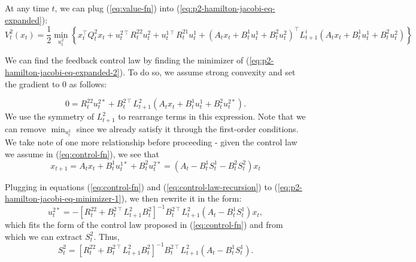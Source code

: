 \documentclass[11pt]{article}
\newcommand{\T}{\intercal}
\newcommand\dd[2]{\frac{\partial#1}{\partial#2}}
\begin{document}
At any time $t$, we can plug (\ref{eq:value-fn}) into (\ref{eq:p2-hamilton-jacobi-eq-expanded}):
\begin{equation}
\label{eq:p2-hamilton-jacobi-eq-expanded-2}
V^2_t(x_t) = \frac{1}{2} \min_{u^2_t} \left\{ x_t^\T Q^2_t x_t
    + u^{2\T}_t R^{22}_t u^2_t
    + u^{1\T}_t R^{21}_t u^1_t
    + \left(A_t x_t + B^{1}_t u^{1}_t + B^{2}_t u^{2}_t\right)^\T L^i_{t+1} \left( A_t x_t + B^{1}_t u^{1}_t + B^{2}_t u^{2}_t \right) \right\}
\end{equation}

We can find the feedback control law by finding the minimizer of (\ref{eq:p2-hamilton-jacobi-eq-expanded-2}). To do so, we assume strong convexity and set the gradient to 0 as follows:

\begin{equation}
\label{eq:p2-hamilton-jacobi-eq-minimizer-1}
0 = R^{22}_t u^{2*}_t + B^{2\T}_t L^2_{t+1} \left( A_t x_t + B^1_t u^1_t + B^2_t u^{2*}_t \right).
\end{equation}
We use the symmetry of $L^2_{t+1}$ to rearrange terms in this expression. Note that we can remove $\min_{u^2_t}$ since we already satisfy it through the first-order conditions. We take note of one more relationship before proceeding - given the control law we assume in (\ref{eq:control-fn}), we see that
\begin{equation}
\label{eq:control-law-recursion}
x_{t+1} = A_t x_t + B^{1}_t u^{1*}_t + B^{2}_t u^{2*}_t = (A_t - B^1_t S^1_t - B^2_t S^2_t)x_t
\end{equation}

Plugging in equations (\ref{eq:control-fn}) and (\ref{eq:control-law-recursion}) to (\ref{eq:p2-hamilton-jacobi-eq-minimizer-1}), we then rewrite it in the form:
\begin{equation}
\label{eq:u2-optimal}
u^{2*}_t = -\left[R^{22}_t + B^{2\T}_t L^2_{t+1} B^2_t\right]^{-1} B^{2\T}_t L^2_{t+1} \left( A_t - B^1_t S^1_t \right) x_t,
\end{equation}
which fits the form of the control law proposed in (\ref{eq:control-fn}) and from which we can extract $S^2_t$. Thus,
\begin{equation}
\label{eq:S2t-recursion}
S^2_t = \left[R^{22}_t + B^{2\T}_t L^2_{t+1} B^2_t\right]^{-1} B^{2\T}_t L^2_{t+1} \left( A_t - B^1_t S^1_t \right).
\end{equation}
\end{document}
